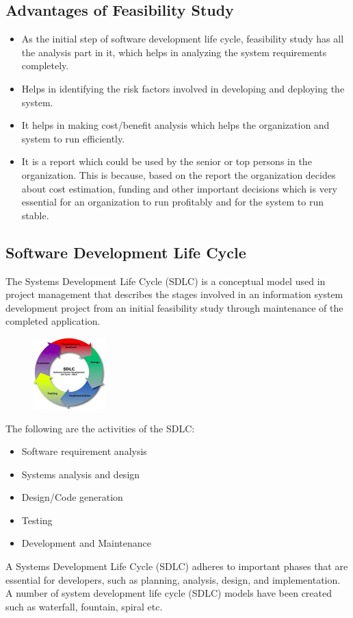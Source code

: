 \documentclass[12pt, a4paper]{report}
\begin{document}
  \subsection{Advantages of Feasibility Study}
    \begin{itemize}
      \item As the initial step of software development life cycle, feasibility study has all the analysis part in it, which helps in analyzing the system requirements completely. 
      \item Helps in identifying the risk factors involved in developing and deploying the system.
      \item It helps in making cost/benefit analysis which helps the organization and system to run efficiently.
      \item It is a report which could be used by the senior or top persons in the organization. This is because, based on the report the organization decides about cost estimation, funding and other important decisions which is very essential for an organization to run profitably and for the system to run stable.
    \end{itemize}
    
  \subsection{Software Development Life Cycle}
  The Systems Development Life Cycle (SDLC) is a conceptual model used in project management that describes the stages involved in an information system development project from an initial feasibility study through maintenance of the completed application. \newline
  \begin{figure}
    \includegraphics[width=0.25\textwidth]{feasibility-study}
  \end{figure}
  The following are the activities of the SDLC:
  \begin{itemize}
      \item Software requirement analysis
      \item Systems analysis and design
      \item Design/Code generation
      \item Testing
      \item Development and Maintenance
  \end{itemize}
  A Systems Development Life Cycle (SDLC) adheres to important phases that are essential for developers, such as planning, analysis, design, and implementation. A number of system development life cycle (SDLC) models have been created such as waterfall, fountain, spiral etc.
  
\end{document}
